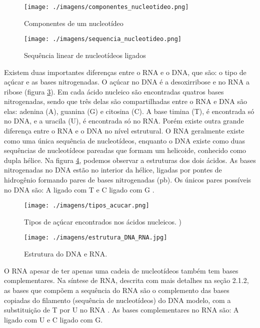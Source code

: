 \begin{figure}[htb!]
    \centering
    \texttt{[image: ./imagens/componentes\_nucleotideo.png]}
    \caption{Componentes de um nucleotídeo}
    \label{fig:nucleotideo}
\end{figure}

\begin{figure}[htb!]
    \centering
    \texttt{[image: ./imagens/sequencia\_nucleotideo.png]}
    \caption{Sequência linear de nucleotídeos ligados}
    \label{fig:sequencia_nucleotideo}
\end{figure}

Existem duas importantes diferenças entre o RNA e o DNA, que são: o tipo de açúcar e as bases nitrogenadas. O açúcar no DNA é a desoxirribose e no RNA a ribose (figura \ref{fig:tipos_acucar}). Em cada ácido nucleico são encontradas quatros bases nitrogenadas, sendo que três delas são compartilhadas entre o RNA e DNA são elas: adenina (A), guanina (G) e citosina (C). A base timina (T), é encontrada só no DNA, e a uracila (U), é encontrada só no RNA. Porém existe outra grande diferença entre o RNA e o DNA no nível estrutural. O RNA geralmente existe como uma única sequência de nucleotídeos, enquanto o DNA existe como duas sequências de nucleotídeos pareadas que formam um helicoide, conhecido como dupla hélice. Na figura \ref{fig:estrutura_DNA_RNA}, podemos observar a estruturas dos dois ácidos. As bases nitrogenadas no DNA estão no interior da hélice, ligadas por pontes de hidrogênio formando pares de bases nitrogenadas (pb). Os únicos pares possíveis no DNA são: A ligado com T e C ligado com G \cite{Zaha2000}.

\begin{figure}[htb!]
    \centering
    \texttt{[image: ./imagens/tipos\_acucar.png]}
    \caption{Tipos de açúcar encontrados nos ácidos nucleicos. \cite[Adaptada]{Berg2007})}
    \label{fig:tipos_acucar}
\end{figure}


\begin{figure}[htb!]
    \centering
    \texttt{[image: ./imagens/estrutura\_DNA\_RNA.jpg]}
    \caption{Estrutura do DNA e RNA. \cite[Adaptada]{Higgs2005}}
    \label{fig:estrutura_DNA_RNA}
\end{figure}



O RNA apesar de ter apenas uma cadeia de nucleotídeos também tem bases complementares. Na síntese de RNA, descrita com mais detalhes na seção 2.1.2, as bases que compõem a sequência do RNA são o complemento das bases copiadas do filamento (sequência de nucleotídeos) do DNA modelo, com a substituição de T por U no RNA . As bases complementares no RNA são: A ligado com U e C ligado com G.


